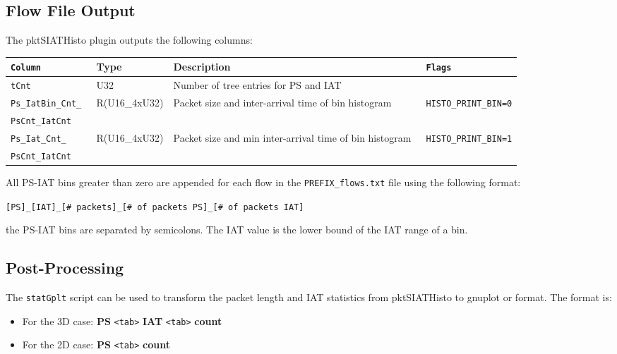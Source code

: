 \documentclass[documentation]{subfiles}
\begin{document}
\subsection{Flow File Output}
The pktSIATHisto plugin outputs the following columns:
\begin{longtable}{>{\tt}lll>{\tt\small}l}
    \toprule
    {\bf Column} & {\bf Type} & {\bf Description} & {\bf Flags}\\
    \midrule\endhead%
    tCnt                & U32           & Number of tree entries for PS and IAT                   & \\
    Ps\_IatBin\_Cnt\_   & R(U16\_4xU32) & Packet size and inter-arrival time of bin histogram     & HISTO\_PRINT\_BIN=0\\
    \quad PsCnt\_IatCnt &               &                                                         & \\
    Ps\_Iat\_Cnt\_      & R(U16\_4xU32) & Packet size and min inter-arrival time of bin histogram & HISTO\_PRINT\_BIN=1\\
    \quad PsCnt\_IatCnt &               &                                                         & \\
    \bottomrule
\end{longtable}

All PS-IAT bins greater than zero are appended for each flow in the {\tt PREFIX\_flows.txt} file using the
following format:
\begin{center}
    {\tt [PS]\_[IAT]\_[\# packets]\_[\# of packets PS]\_[\# of packets IAT]}
\end{center}
the PS-IAT bins are separated by semicolons. The IAT value is the lower bound of the IAT range of a bin.

\subsection{Post-Processing}
The {\tt statGplt} script can be used to transform the packet length and IAT statistics from pktSIATHisto to gnuplot or  format. The format is:
\begin{itemize}
    \item For the 3D case: {\bf PS} {\tt <tab>} {\bf IAT} {\tt <tab>} {\bf count}
    \item For the 2D case: {\bf PS} {\tt <tab>} {\bf count}
\end{itemize}
\end{document}
